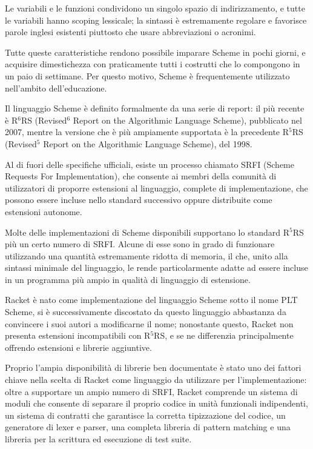 Le variabili e le funzioni condividono un singolo spazio di
indirizzamento, e tutte le variabili hanno scoping lessicale; la sintassi
\`e estremamente regolare e favorisce parole inglesi esistenti piuttosto
che usare abbreviazioni o acronimi.

Tutte queste caratteristiche rendono possibile imparare Scheme in pochi
giorni, e acquisire dimestichezza con praticamente tutti i costrutti che
lo compongono in un paio di settimane. Per questo motivo, Scheme \`e
frequentemente utilizzato nell'ambito dell'educazione.

Il linguaggio Scheme \`e definito formalmente da una serie di report: il
pi\`u recente \`e R$^{6}$RS (Revised$^{6}$ Report on the Algorithmic
Language Scheme), pubblicato nel 2007, mentre la versione che \`e pi\`u
ampiamente supportata \`e la precedente R$^{5}$RS (Revised$^{5}$ Report
on the Algorithmic Language Scheme\cite{r5rs}), del 1998.

Al di fuori delle specifiche ufficiali, esiste un processo chiamato
SRFI (Scheme Requests For Implementation), che consente ai membri della
comunit\`a di utilizzatori di proporre estensioni al linguaggio, complete
di implementazione, che possono essere incluse nello standard successivo
oppure distribuite come estensioni autonome.

Molte delle implementazioni di Scheme disponibili supportano lo
standard R$^{5}$RS pi\`u un certo numero di SRFI. Alcune di esse sono
in grado di funzionare utilizzando una quantit\`a estremamente ridotta
di memoria, il che, unito alla sintassi minimale del linguaggio, le
rende particolarmente adatte ad essere incluse in un programma pi\`u
ampio in qualit\`a di linguaggio di estensione.

Racket \`e nato come implementazione del linguaggio Scheme sotto il nome
PLT Scheme, si \`e successivamente discostato da questo linguaggio
abbastanza da convincere i suoi autori a modificarne il nome; nonostante
questo, Racket non presenta estensioni incompatibili con R$^{5}$RS, e
se ne differenzia principalmente offrendo estensioni e librerie
aggiuntive.

Proprio l'ampia disponibilit\`a di librerie ben documentate \`e stato
uno dei fattori chiave nella scelta di Racket come linguaggio da
utilizzare per l'implementazione: oltre a supportare un ampio numero
di SRFI, Racket comprende un sistema di moduli che consente di separare
il proprio codice in unit\`a funzionali indipendenti, un sistema di
contratti che garantisce la corretta tipizzazione del codice, un
generatore di lexer e parser, una completa libreria di pattern matching
e una libreria per la scrittura ed esecuzione di test suite.

